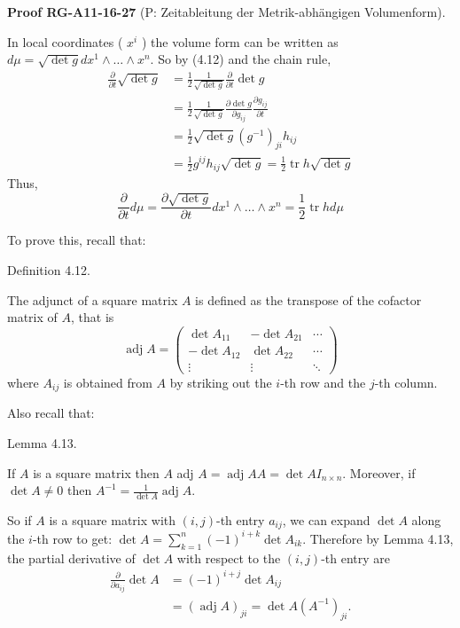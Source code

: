 \documentclass[10pt, letterpaper]{article}
\newcommand{\CustomHeading}[3]{%
  \par\medskip\noindent%
  \textbf{#1 #2} \textnormal{(#3)}.\enskip%
}
\newenvironment{PROOF}[2]{\begin{unitbox}\CustomHeading{Proof}{#1}{#2}}{\end{unitbox}}
\begin{document}
\begin{PROOF}{RG-A11-16-27}{P: Zeitableitung der Metrik-abhängigen Volumenform}
In local coordinates ( $x^{i}$ ) the volume form can be written as $d \mu=\sqrt{\operatorname{det} g} d x^{1} \wedge \ldots \wedge x^{n}$. So by (4.12) and the chain rule,
$$
\begin{aligned}
\frac{\partial}{\partial t} \sqrt{\operatorname{det} g} & =\frac{1}{2} \frac{1}{\sqrt{\operatorname{det} g}} \frac{\partial}{\partial t} \operatorname{det} g \\
& =\frac{1}{2} \frac{1}{\sqrt{\operatorname{det} g}} \frac{\partial \operatorname{det} g}{\partial g_{i j}} \frac{\partial g_{i j}}{\partial t} \\
& =\frac{1}{2} \sqrt{\operatorname{det} g}\left(g^{-1}\right)_{j i} h_{i j} \\
& =\frac{1}{2} g^{i j} h_{i j} \sqrt{\operatorname{det} g}=\frac{1}{2} \operatorname{tr} h \sqrt{\operatorname{det} g}
\end{aligned}
$$
Thus,
$$
\frac{\partial}{\partial t} d \mu=\frac{\partial \sqrt{\operatorname{det} g}}{\partial t} d x^{1} \wedge \ldots \wedge x^{n}=\frac{1}{2} \operatorname{tr} h d \mu
$$
\end{PROOF}


To prove this, recall that:


Definition 4.12. 

The adjunct of a square matrix $A$ is defined as the transpose of the cofactor matrix of $A$, that is
$$
\operatorname{adj} A=\left(\begin{array}{ccc}
\operatorname{det} A_{11} & -\operatorname{det} A_{21} & \cdots \\
-\operatorname{det} A_{12} & \operatorname{det} A_{22} & \cdots \\
\vdots & \vdots & \ddots
\end{array}\right)
$$
where $A_{i j}$ is obtained from $A$ by striking out the $i$-th row and the $j$-th column.

Also recall that:


Lemma 4.13. 

If $A$ is a square matrix then $A$ adj $A=\operatorname{adj} A A=\operatorname{det} A I_{n \times n}$. Moreover, if $\operatorname{det} A \neq 0$ then $A^{-1}=\frac{1}{\operatorname{det} A} \operatorname{adj} A$.

So if $A$ is a square matrix with $(i, j)$-th entry $a_{i j}$, we can expand $\operatorname{det} A$ along the $i$-th row to get: $\operatorname{det} A=\sum_{k=1}^{n}(-1)^{i+k} \operatorname{det} A_{i k}$. Therefore by Lemma 4.13, the partial derivative of $\operatorname{det} A$ with respect to the $(i, j)$-th entry are
$$
\begin{aligned}
\frac{\partial}{\partial a_{i j}} \operatorname{det} A & =(-1)^{i+j} \operatorname{det} A_{i j} \\
& =(\operatorname{adj} A)_{j i}=\operatorname{det} A\left(A^{-1}\right)_{j i} .
\end{aligned}
$$
\end{document}
